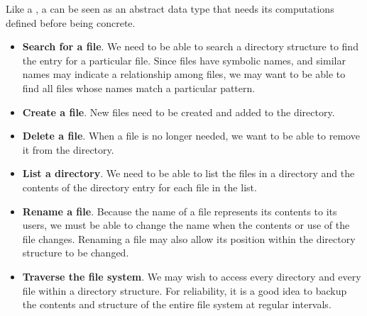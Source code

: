 Like a , a  can be seen as an abstract data type that needs its computations defined before being concrete.
\begin{itemize}[noitemsep]
\item \textbf{Search for a file}.
  We need to be able to search a directory structure to find the entry for a particular file.
  Since files have symbolic names, and similar names may indicate a relationship among files, we may want to be able to find all files whose names match a particular pattern.

\item \textbf{Create a file}.
  New files need to be created and added to the directory.

\item \textbf{Delete a file}.
  When a file is no longer needed, we want to be able to remove it from the directory.

\item \textbf{List a directory}.
  We need to be able to list the files in a directory and the contents of the directory entry for each file in the list.

\item \textbf{Rename a file}.
  Because the name of a file represents its contents to its users, we must be able to change the name when the contents or use of the file changes.
  Renaming a file may also allow its position within the directory structure to be changed.

\item \textbf{Traverse the file system}.
  We may wish to access every directory and every file within a directory structure.
  For reliability, it is a good idea to backup the contents and structure of the entire file system at regular intervals.
\end{itemize}


